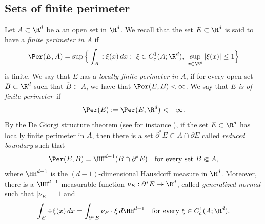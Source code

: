\subsection{Sets of finite perimeter}\label{sub:perimeter}
Let $A\subset\R^d$ be a an open set in $\R^d$. We recall that the set $E\subset\R^d$ is said to have a {\it finite perimeter in $A$} if\enlargethispage{.5\baselineskip}%
\begin{equation}\label{e:per}\Per(E,A)=\sup\Big\{\int_{A}\div\xi(x)\,dx:\ \xi\in C^1_c(A;\R^d),\ \sup_{x\in \R^d}|\xi (x)|\le 1\Big\}
\end{equation}
is finite. We say that $E$ has a {\it locally finite perimeter in $A$}, if for every open set $B\subset \R^d$ such that $\overline B\subset A$, we have that $\Per(E,B)<\infty$. We say that {\it $E$ is of finite perimeter}~if\vspace*{-3pt}
\[\Per(E):=\Per(E,\R^d)<+\infty.\]
By the De Giorgi structure theorem (see for instance \cite[Th.\,II.4.9]{maggi}), if the set $E\subset \R^d$ has locally finite perimeter in $A$, then there is a set $\partial^\ast E\subset A\cap \partial E$ called {\it reduced boundary} such that
\[\Per(E,B)=\HH^{d-1}(B\cap\partial^\ast E)\quad\text{for every set } B\Subset A,\]
where $\HH^{d-1}$ is the $(d-1)$-dimensional Hausdorff measure in $\R^d$.
Moreover, there is a $\HH^{d-1}$-measurable function $\nu_E:\partial^\ast E\to\R^d$, called {\it generalized normal} such that $|\nu_E|=1$ and\vspace*{-3pt}
\[\int_E\div\xi(x)\,dx=\int_{\partial^\ast E}\nu_E\cdot \xi\,d\HH^{d-1}\quad\text{for every } \xi\in C^1_c(A;\R^d).\]
